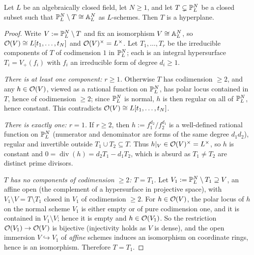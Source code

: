 \begin{lemma}\label{lemma:complement_of_affine_space_r2}
    Let $L$ be an algebraically closed field, let $N \geq 1$, and let
    $T \subsetneq \mathbb{P}^N_L$ be a closed subset such that $\mathbb{P}^N_L \setminus T \cong \mathbb{A}^N_L$ as
    $L$-schemes. Then $T$ is a hyperplane.
\end{lemma}
\begin{proof}
    Write $V := \mathbb{P}^N_L \setminus T$ and fix an isomorphism $V \cong \mathbb{A}^N_L$, so
    $\mathcal{O}(V) \cong L[t_1, \dots, t_N]$ and $\mathcal{O}(V)^\times = L^\times$. Let $T_1, \dots, T_r$ be
    the irreducible components of $T$ of codimension $1$ in $\mathbb{P}^N_L$; each is an integral
    hypersurface $T_i = V_+(f_i)$ with $f_i$ an irreducible form of degree $d_i \geq 1$.

    \emph{There is at least one component: $r \geq 1$.} Otherwise $T$ has codimension $\geq 2$,
    and any $h \in \mathcal{O}(V)$, viewed as a rational function on $\mathbb{P}^N_L$, has polar locus
    contained in $T$, hence of codimension $\geq 2$; since $\mathbb{P}^N_L$ is normal, $h$ is then
    regular on all of $\mathbb{P}^N_L$, hence constant. This contradicts
    $\mathcal{O}(V) \cong L[t_1, \dots, t_N]$.

    \emph{There is exactly one: $r = 1$.} If $r \geq 2$, then $h := f_1^{d_2} / f_2^{d_1}$ is a
    well-defined rational function on $\mathbb{P}^N_L$ (numerator and denominator are forms of the
    same degree $d_1 d_2$), regular and invertible outside $T_1 \cup T_2 \subseteq T$. Thus
    $h|_V \in \mathcal{O}(V)^\times = L^\times$, so $h$ is constant and
    $0 = \operatorname{div}(h) = d_2 T_1 - d_1 T_2$, which is absurd as $T_1 \neq T_2$ are
    distinct prime divisors.

    \emph{$T$ has no components of codimension $\geq 2$: $T = T_1$.} Let
    $V_1 := \mathbb{P}^N_L \setminus T_1 \supseteq V$, an affine open (the complement of a
    hypersurface in projective space), with $V_1 \setminus V = T \setminus T_1$ closed in
    $V_1$ of codimension $\geq 2$. For $h \in \mathcal{O}(V)$, the polar locus of $h$ on the normal
    scheme $V_1$ is either empty or of pure codimension one, and it is contained in
    $V_1 \setminus V$; hence it is empty and $h \in \mathcal{O}(V_1)$. So the restriction
    $\mathcal{O}(V_1) \to \mathcal{O}(V)$ is bijective (injectivity holds as $V$ is dense), and the open
    immersion $V \hookrightarrow V_1$ of \emph{affine} schemes induces an isomorphism on
    coordinate rings, hence is an isomorphism. Therefore $T = T_1$.


\end{proof}

